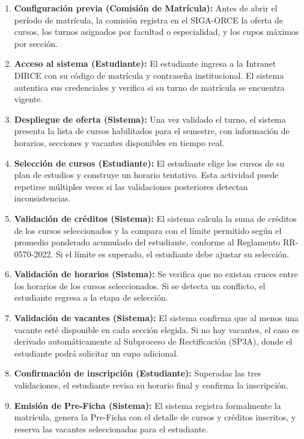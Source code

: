 \begin{enumerate}
    \item \textbf{Configuración previa (Comisión de Matrícula):} Antes de abrir el
    período de matrícula, la comisión registra en el SIGA-ORCE la oferta de cursos, los
    turnos asignados por facultad o especialidad, y los cupos máximos por sección.

    \item \textbf{Acceso al sistema (Estudiante):} El estudiante ingresa a la Intranet
    DIRCE con su código de matrícula y contraseña institucional. El sistema autentica sus
    credenciales y verifica si su turno de matrícula se encuentra vigente.

    \item \textbf{Despliegue de oferta (Sistema):} Una vez validado el turno, el sistema
    presenta la lista de cursos habilitados para el semestre, con información de horarios,
    secciones y vacantes disponibles en tiempo real.

    \item \textbf{Selección de cursos (Estudiante):} El estudiante elige los cursos de
    su plan de estudios y construye un horario tentativo. Esta actividad puede repetirse
    múltiples veces si las validaciones posteriores detectan inconsistencias.

    \item \textbf{Validación de créditos (Sistema):} El sistema calcula la suma de
    créditos de los cursos seleccionados y la compara con el límite permitido según el
    promedio ponderado acumulado del estudiante, conforme al Reglamento RR-0570-2022.
    Si el límite es superado, el estudiante debe ajustar su selección.

    \item \textbf{Validación de horarios (Sistema):} Se verifica que no existan cruces
    entre los horarios de los cursos seleccionados. Si se detecta un conflicto, el
    estudiante regresa a la etapa de selección.

    \item \textbf{Validación de vacantes (Sistema):} El sistema confirma que al menos
    una vacante esté disponible en cada sección elegida. Si no hay vacantes, el caso es
    derivado automáticamente al Subproceso de Rectificación (SP3A), donde el estudiante
    podrá solicitar un cupo adicional.

    \item \textbf{Confirmación de inscripción (Estudiante):} Superadas las tres
    validaciones, el estudiante revisa su horario final y confirma la inscripción.

    \item \textbf{Emisión de Pre-Ficha (Sistema):} El sistema registra formalmente la
    matrícula, genera la Pre-Ficha con el detalle de cursos y créditos inscritos, y
    reserva las vacantes seleccionadas para el estudiante.
\end{enumerate}

